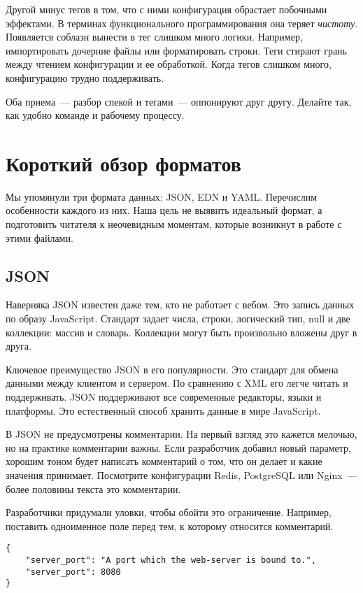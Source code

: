 Другой минус тегов в том, что с ними конфигурация обрастает побочными
эффектами. В терминах функционального программирования она теряет
\emph{чистоту}. Появляется соблазн вынести в тег слишком много логики. Например,
импортировать дочерние файлы или форматировать строки. Теги стирают грань между
чтением конфигурации и ее обработкой. Когда тегов слишком много, конфигурацию
трудно поддерживать.

Оба приема~--- разбор спекой и тегами~--- оппонируют друг другу. Делайте так,
как удобно команде и рабочему процессу.

\section{Короткий обзор форматов}

Мы упомянули три формата данных: JSON, EDN и YAML. Перечислим особенности
каждого из них. Наша цель не выявить идеальный формат, а подготовить читателя к
неочевидным моментам, которые возникнут в работе с этими файлами.

\subsection{JSON}

Наверняка JSON известен даже тем, кто не работает с вебом. Это запись данных по
образу JavaScript. Стандарт задает числа, строки, логический тип, null и две
коллекции: массив и словарь. Коллекции могут быть произвольно вложены друг в
друга.

Ключевое преимущество JSON в его популярности. Это стандарт для обмена данными
между клиентом и сервером. По сравнению с XML его легче читать и
поддерживать. JSON поддерживают все современные редакторы, языки и
платформы. Это естественный способ хранить данные в мире JavaScript.

В JSON не предусмотрены комментарии. На первый взгляд это кажется мелочью, но на
практике комментарии важны. Если разработчик добавил новый параметр, хорошим
тоном будет написать комментарий о том, что он делает и какие значения
принимает. Посмотрите конфигурации Redis, PostgreSQL или Nginx~--- более
половины текста это комментарии.

Разработчики придумали уловки, чтобы обойти это ограничение. Например, поставить
одноименное поле перед тем, к которому относится комментарий.

\begin{verbatim}
{
    "server_port": "A port which the web-server is bound to.",
    "server_port": 8080
}
\end{verbatim}

